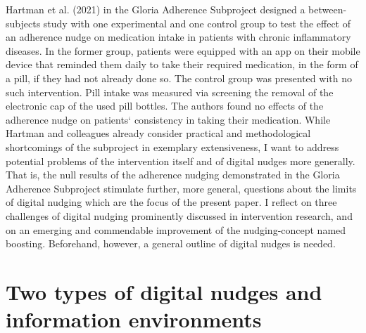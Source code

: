\documentclass[reflection, authordate,issue]{jote-new-article}
\begin{document}
Hartman et al. (2021) in the Gloria Adherence Subproject designed a between-subjects study with one experimental and one control group to test the effect of an adherence nudge on medication intake in patients with chronic inflammatory diseases. In the former group, patients were equipped with an app on their mobile device that reminded them daily to take their required medication, in the form of a pill, if they had not already done so. The control group was presented with no such intervention. Pill intake was measured via screening the removal of the electronic cap of the used pill bottles. The authors found no effects of the adherence nudge on patients‘ consistency in taking their medication. While Hartman and colleagues already consider practical and methodological shortcomings of the subproject in exemplary extensiveness, I want to address potential problems of the intervention itself and of digital nudges more generally. That is, the null results of the adherence nudging demonstrated in the Gloria Adherence Subproject stimulate further, more general, questions about the limits of digital nudging which are the focus of the present paper. I reflect on three challenges of digital nudging prominently discussed in intervention research, and on an emerging and commendable improvement of the nudging-concept named boosting. Beforehand, however, a general outline of digital nudges is needed.



\section{Two types of digital nudges and information environments}
\end{document}
